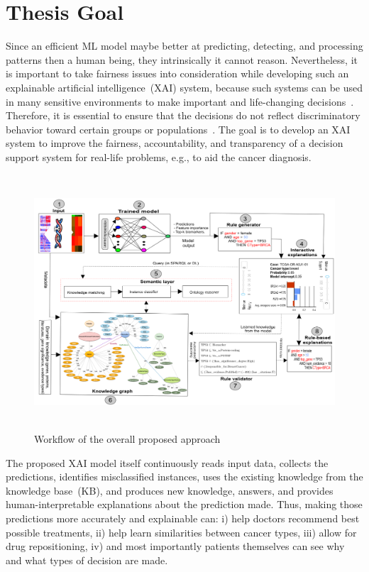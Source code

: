 \section{Thesis Goal} \label{goals}
Since an efficient ML model maybe better at predicting, detecting, and processing patterns then a human being, they intrinsically it cannot reason. Nevertheless, it is important to take fairness issues into consideration while developing such an explainable artificial intelligence~(XAI) system, because such systems can be used in many sensitive environments to make important and life-changing decisions~\cite{stiglic2020interpretability}. Therefore, it is essential to ensure that the decisions do not reflect discriminatory behavior toward certain groups or populations~\cite{mehrabi2019survey}. The goal is to develop an XAI system to improve the fairness, accountability, and transparency of a decision support system for real-life problems, e.g., to aid the cancer diagnosis. 

\begin{figure}[h]
	\centering
	\includegraphics[width=\textwidth,height=95mm]{images/fair_rule_generator.png}	
    \caption{Workflow of the overall proposed approach}
	\label{fig:wf_overall_approach}
\end{figure}

\hspace*{3.5mm} The proposed XAI model itself continuously reads input data, collects the predictions, identifies misclassified instances, uses the existing knowledge from the knowledge base~(KB), and produces new knowledge, answers, and provides human-interpretable explanations about the prediction made. Thus, making those predictions more accurately and explainable can: i) help doctors recommend best possible treatments, ii) help learn similarities between cancer types, iii) allow for drug repositioning, iv) and most importantly patients themselves can see why and what types of decision are made. 

